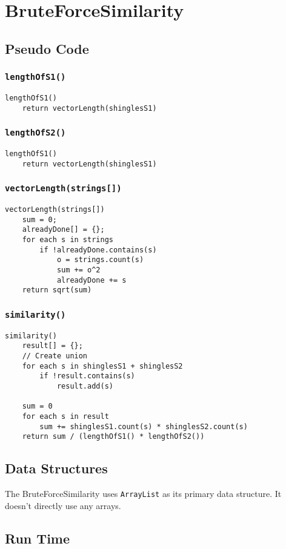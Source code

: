 \documentclass[10pt,letterpaper]{article}
\begin{document}
\section{BruteForceSimilarity}
\subsection{Pseudo Code}
\subsubsection{\texttt{lengthOfS1()}}
\begin{verbatim}
lengthOfS1()
    return vectorLength(shinglesS1)
\end{verbatim}
\subsubsection{\texttt{lengthOfS2()}}
\begin{verbatim}
lengthOfS1()
    return vectorLength(shinglesS1)
\end{verbatim}
\subsubsection{\texttt{vectorLength(strings[])}}
\begin{verbatim}
vectorLength(strings[])
    sum = 0;
    alreadyDone[] = {};
    for each s in strings
        if !alreadyDone.contains(s)
            o = strings.count(s)
            sum += o^2
            alreadyDone += s
    return sqrt(sum)
\end{verbatim}
\subsubsection{\texttt{similarity()}}
\begin{verbatim}
similarity()
    result[] = {};
    // Create union
    for each s in shinglesS1 + shinglesS2
        if !result.contains(s)
            result.add(s)

    sum = 0
    for each s in result
        sum += shinglesS1.count(s) * shinglesS2.count(s)
    return sum / (lengthOfS1() * lengthOfS2())
\end{verbatim}
\subsection{Data Structures}
The BruteForceSimilarity uses \texttt{ArrayList} as its primary data structure. It doesn't directly use any arrays.
\subsection{Run Time}
\end{document}
